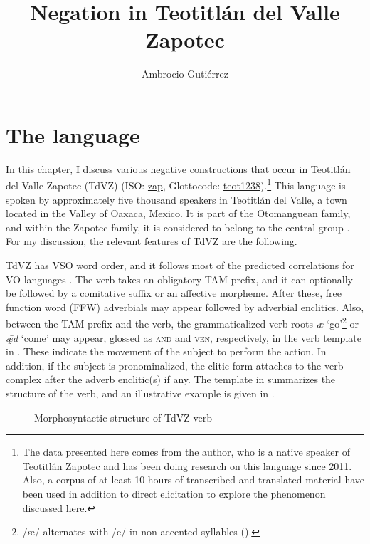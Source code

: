 \documentclass[output=paper,colorlinks=true, citecolor=brown]{langscibook}
\author{Ambrocio Gutiérrez\affiliation{University of Colorado Boulder}}
\title{Negation in Teotitlán del Valle Zapotec}
\begin{document}
\maketitle 
\section{The language}\label{sec:zap:1}
In this chapter, I discuss various negative constructions that occur in Teotitlán del Valle Zapotec (TdVZ)
(ISO: \href{https://iso639-3.sil.org/code/zap}{zap}, Glottocode: \href{https://glottolog.org/resource/languoid/id/teot1238}{teot1238}).\footnote{The data presented here comes from the author, who is a native speaker of Teotitlán Zapotec and has been doing research on this language since 2011. Also, a corpus of at least 10 hours of transcribed and translated material have been used in addition to direct elicitation to explore the phenomenon discussed here.}
This language is spoken by approximately five thousand speakers in Teotitlán del Valle, a town located in the Valley of Oaxaca, Mexico. It is part of the Otomanguean family, and within the Zapotec family, it is considered to belong to the central group \citep{Smith-Stark2007}. For my discussion, the relevant features of TdVZ are the following.

TdVZ has  VSO word order, and it follows most of the predicted correlations for VO languages \citep{Dryer1997sixway}. The verb takes an obligatory TAM prefix, and it can optionally be followed by a comitative suffix or an affective morpheme. After these, free function word (FFW) adverbials may appear followed by adverbial enclitics. Also, between the TAM prefix and the verb, the grammaticalized verb roots \textit{æ} ‘go’\footnote{/æ/ alternates with /e/ in non-accented syllables (\citealt{UchiharaGutiérrez2020}).}  or \textit{ǣ̰d} ‘come’ may appear, glossed as \textsc{and} and \textsc{ven}, respectively, in the verb template in .
These indicate the movement of the subject to perform the action. In addition, if the subject is pronominalized, the clitic form attaches to the verb complex after the adverb enclitic(s) if any. The template in  summarizes the structure of the verb, and an illustrative example is given in . \medskip


\begin{figure}
\caption{Morphosyntactic structure of TdVZ verb} 
\label{fig:zap:1}
\end{figure}
\end{document}
